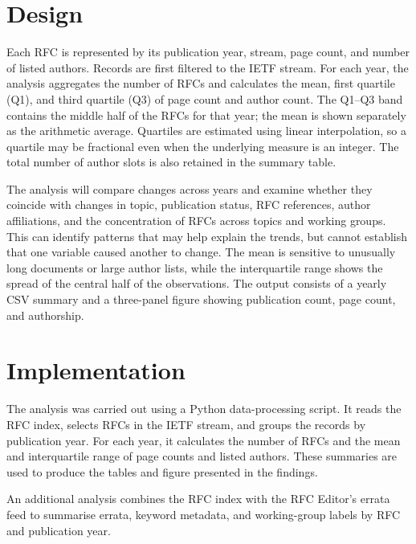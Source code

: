 \documentclass{l4proj}
\begin{document}
\chapter{Design}
Each RFC is represented by its publication year, stream, page count, and number of listed authors. Records are first filtered to the IETF stream. For each year, the analysis aggregates the number of RFCs and calculates the mean, first quartile (Q1), and third quartile (Q3) of page count and author count. The Q1--Q3 band contains the middle half of the RFCs for that year; the mean is shown separately as the arithmetic average. Quartiles are estimated using linear interpolation, so a quartile may be fractional even when the underlying measure is an integer. The total number of author slots is also retained in the summary table.

\begin{highlight}
The analysis will compare changes across years and examine whether they coincide with changes in topic, publication status, RFC references, author affiliations, and the concentration of RFCs across topics and working groups. This can identify patterns that may help explain the trends, but cannot establish that one variable caused another to change. The mean is sensitive to unusually long documents or large author lists, while the interquartile range shows the spread of the central half of the observations. The output consists of a yearly CSV summary and a three-panel figure showing publication count, page count, and authorship.
\end{highlight}

\chapter{Implementation}
The analysis was carried out using a Python data-processing script. It reads the RFC index, selects RFCs in the IETF stream, and groups the records by publication year. For each year, it calculates the number of RFCs and the mean and interquartile range of page counts and listed authors. These summaries are used to produce the tables and figure presented in the findings.

An additional analysis combines the RFC index with the RFC Editor's errata feed \citep{RFCEditorErrata} to summarise errata, keyword metadata, and working-group labels by RFC and publication year.
\end{document}
